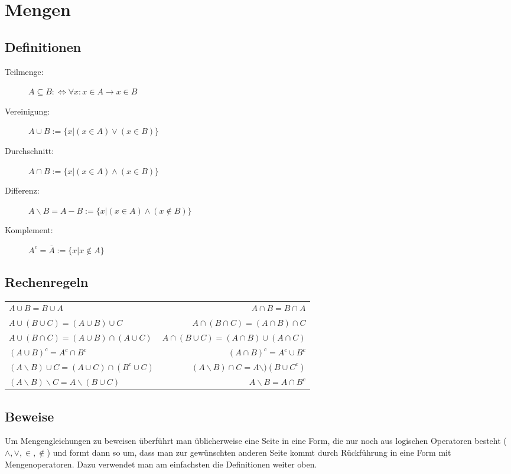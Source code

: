 \section{Mengen}

\subsection{Definitionen}
\begin{description}
	\item [Teilmenge:] $A \subseteq B :\Leftrightarrow \forall x: x \in A \rightarrow x \in B$
	\item [Vereinigung:] $A \cup B := \{x | (x \in A) \lor (x \in B)\}$
	\item [Durchschnitt:] $A \cap B := \{x | (x \in A) \land (x \in B)\}$
	\item [Differenz:] $A \backslash B = A - B := \{x | (x \in A) \land (x \not\in B)\}$
	\item [Komplement:] $A^c = \overline{A} := \{x | x \not\in A\}$
\end{description}

\subsection{Rechenregeln}
{\footnotesize
\begin{tabular}{|l|r|}\hline
$A \cup B = B \cup A$ & $A \cap B = B \cap A$\\
$A \cup (B \cup C) = (A \cup B) \cup C$ & $A \cap (B \cap C) = (A \cap B) \cap C$\\
$A \cup (B \cap C) = (A \cup B) \cap (A \cup C)$ & $A \cap (B \cup C) = (A \cap B) \cup (A \cap C)$\\
$(A \cup B)^c = A^c \cap B^c$ & $(A \cap B)^c = A^c \cup B^c$\\
$(A \backslash B) \cup C = (A \cup C) \cap (B^c \cup C)$ & $(A \backslash B) \cap C = A \backslash )(B \cup C^c)$\\
$(A \backslash B) \backslash C = A \backslash (B \cup C)$ & $A \backslash B = A \cap B^c$\\\hline
\end{tabular}
}

\subsection{Beweise}
Um Mengengleichungen zu beweisen überführt man üblicherweise eine Seite in eine Form,
die nur noch aus logischen Operatoren besteht ($\land, \lor, \in, \not\in$) und formt
dann so um, dass man zur gewünschten anderen Seite kommt durch Rückführung in eine
Form mit Mengenoperatoren. Dazu verwendet man am einfachsten die Definitionen weiter oben.

